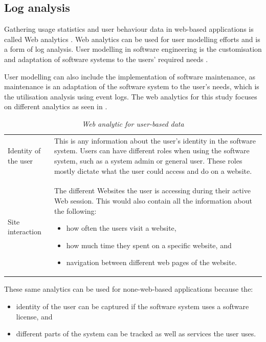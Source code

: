 \subsection{Log analysis}\label{sec:ch1_systemUtilisation}
Gathering usage statistics and user behaviour data in web-based applications is called Web analytics \cite{Kocsis2012}. Web analytics can be used for user modelling efforts and is a form of log analysis. User modelling in software engineering is the customisation and adaptation of software systems to the users' required needs \cite{Waqar2017, Paliouras1999}. \par User modelling can also include the implementation of software maintenance, as maintenance is an adaptation of the software system to the user's needs, which is the utilisation analysis using event logs. The web analytics for this study focuses on different analytics as seen in . 

\begin{table}[!htb]
	\centering
	\caption[Web analytic for user-based data]
	{\textit{Web analytic for user-based data}}
	\label{tbl:ch1_webAnalytics}
	\begin{tabularx}{\textwidth}{lX}
		\toprule 
		\thead{Analytic}  & \thead{Description} \\
		\midrule

		\rowcolor{lightgray}
		Identity of the user & This is any information about the user's identity in the software system. Users can have different roles when using the software system, such as a system admin or general user. These roles mostly dictate what the user could access and do on a website. \\

		Site interaction & The different Websites the user is accessing during their active Web session. This would also contain all the information about the following: 
		\begin{itemize}
			\item how often the users visit a website,
			\item how much time they spent on a specific website, and
			\item navigation between different web pages of the website.
		\end{itemize}
		\\
		\bottomrule
	\end{tabularx}
\end{table}

These same analytics can be used for none-web-based applications because the: 
\begin{itemize}
	\item identity of the user can be captured if the software system uses a software license, and
	\item different parts of the system can be tracked as well as services the user uses.
\end{itemize} 

